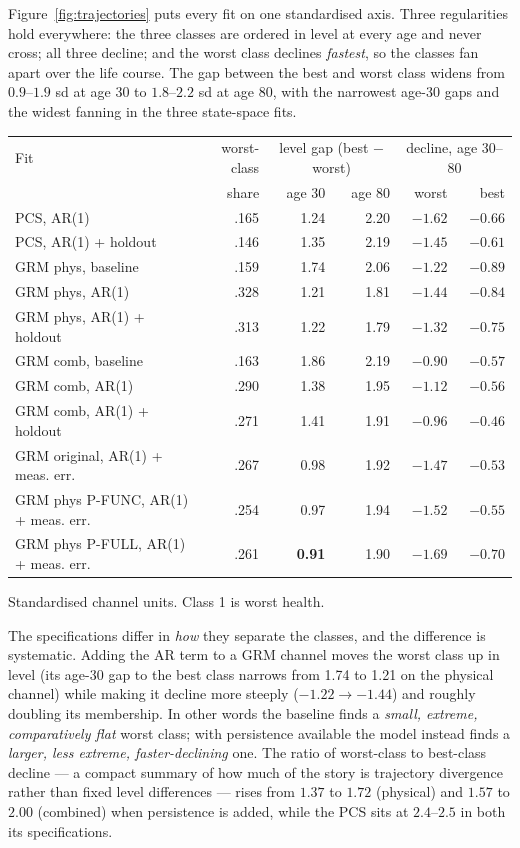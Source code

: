 \documentclass[11pt]{article}
\begin{document}
Figure~\ref{fig:trajectories} puts every fit on one standardised axis. Three
regularities hold everywhere: the three classes are ordered in level at
every age and never cross; all three decline; and the worst class declines
\emph{fastest}, so the classes fan apart over the life course. The gap
between the best and worst class widens from $0.9$--$1.9$ sd at age 30 to
$1.8$--$2.2$ sd at age 80, with the narrowest age-30 gaps and the widest
fanning in the three state-space fits.

\begin{center}\small
\begin{tabular}{lrrrrr}
\toprule
Fit & worst-class & \multicolumn{2}{c}{level gap (best $-$ worst)} &
\multicolumn{2}{c}{decline, age 30--80} \\
 & share & age 30 & age 80 & worst & best \\
\midrule
PCS, AR(1) & .165 & 1.24 & 2.20 & $-1.62$ & $-0.66$ \\
PCS, AR(1) + holdout & .146 & 1.35 & 2.19 & $-1.45$ & $-0.61$ \\
GRM phys, baseline & .159 & 1.74 & 2.06 & $-1.22$ & $-0.89$ \\
GRM phys, AR(1) & .328 & 1.21 & 1.81 & $-1.44$ & $-0.84$ \\
GRM phys, AR(1) + holdout & .313 & 1.22 & 1.79 & $-1.32$ & $-0.75$ \\
GRM comb, baseline & .163 & 1.86 & 2.19 & $-0.90$ & $-0.57$ \\
GRM comb, AR(1) & .290 & 1.38 & 1.95 & $-1.12$ & $-0.56$ \\
GRM comb, AR(1) + holdout & .271 & 1.41 & 1.91 & $-0.96$ & $-0.46$ \\
\addlinespace
GRM original, AR(1) + meas. err. & .267 & 0.98 & 1.92 & $-1.47$ & $-0.53$ \\
GRM phys P-FUNC, AR(1) + meas. err. & .254 & 0.97 & 1.94 & $-1.52$ & $-0.55$ \\
GRM phys P-FULL, AR(1) + meas. err. & .261 & \textbf{0.91} & 1.90 & $\mathbf{-1.69}$ & $-0.70$ \\
\bottomrule
\end{tabular}

{\scriptsize Standardised channel units. Class 1 is worst health.}
\end{center}

The specifications differ in \emph{how} they separate the classes, and the
difference is systematic. Adding the AR term to a GRM channel moves the
worst class up in level (its age-30 gap to the best class narrows from 1.74
to 1.21 on the physical channel) while making it decline more steeply
($-1.22 \to -1.44$) and roughly doubling its membership. In other words the
baseline finds a \emph{small, extreme, comparatively flat} worst class; with
persistence available the model instead finds a \emph{larger, less extreme,
faster-declining} one. The ratio of worst-class to best-class decline --- a
compact summary of how much of the story is trajectory divergence rather
than fixed level differences --- rises from $1.37$ to $1.72$ (physical) and
$1.57$ to $2.00$ (combined) when persistence is added, while the PCS sits
at $2.4$--$2.5$ in both its specifications.
\end{document}
